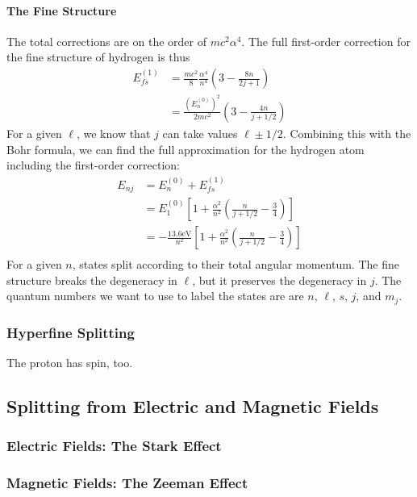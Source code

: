 \documentclass[a4paper]{article}
\begin{document}
\paragraph{The Fine Structure}
The total corrections are on the order of $mc^2\alpha^4$. The full first-order
correction for the fine structure of hydrogen is thus
\begin{align*}
	E_{fs}^{(1)} &= \frac{mc^2}{8}\frac{\alpha^4}{n^4}\left(
	3-\frac{8n}{2j+1}\right)\\
	&= \frac{\left(E_n^{(0)}\right)^2}{2mc^2}\left(
	3-\frac{4n}{j+1/2}\right)
\end{align*}
For a given $\ell$, we know that $j$ can take values $\ell \pm 1/2$.
Combining this with the Bohr formula, we can find the full approximation for
the hydrogen atom including the first-order correction:
\begin{align*}
	E_{nj} &= E_n^{(0)} + E_{fs}^{(1)}\\
	       &= E_1^{(0)}\left[1+\frac{\alpha^2}{n^2}\left(\frac{n}{j+1/2}-
		\frac{3}{4}\right)\right]\\
		&= -\frac{13.6\mathrm{eV}}{n^2}
		\left[1+\frac{\alpha^2}{n^2}\left(\frac{n}{j+1/2}-
		\frac{3}{4}\right)\right]\\
\end{align*}
For a given $n$, states split according to their total angular momentum. The
fine structure breaks the degeneracy in $\ell$, but it preserves the degeneracy
in $j$. The quantum numbers we want to use to label the states are
are $n$, $\ell$, $s$, $j$, and $m_j$.

\subsubsection{Hyperfine Splitting}
The proton has spin, too.

\subsection{Splitting from Electric and Magnetic Fields}
\subsubsection{Electric Fields: The Stark Effect}
\subsubsection{Magnetic Fields: The Zeeman Effect}
\end{document}
